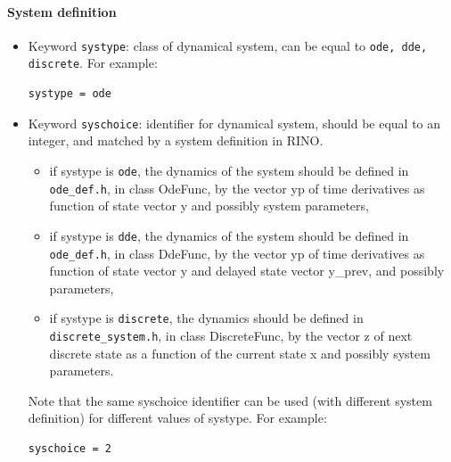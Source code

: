 \documentclass{article}
\begin{document}
\paragraph{System definition}
\begin{itemize}
\item Keyword \texttt{systype}: class of dynamical system, can be equal to \texttt{ode, dde, discrete}.  For example:
\begin{verbatim}
systype = ode
\end{verbatim}

\item Keyword \texttt{syschoice}: identifier for dynamical system,  should be equal to an integer, and matched by a system definition in RINO.
\begin{itemize}
\item if systype is \texttt{ode}, the dynamics of the system should be defined in   \texttt{ode\_def.h}, in class OdeFunc,  by the vector yp  of time derivatives as function of state vector y and possibly system parameters, 
\item if systype is \texttt{dde}, the dynamics of the system should be defined in   \texttt{ode\_def.h}, in class DdeFunc,  by the vector yp  of time derivatives as function of state vector y and delayed state vector y\_prev,  and possibly parameters,
\item if systype is \texttt{discrete},  the dynamics should be defined in \texttt{discrete\_system.h}, in class DiscreteFunc, by the vector z of next discrete state as a function of the current state x and possibly system parameters. 
\end{itemize}
Note that the same syschoice identifier can be used (with different system definition) for different values of systype.  
For example:
\begin{verbatim}
syschoice = 2
\end{verbatim}
\end{itemize}
\end{document}
